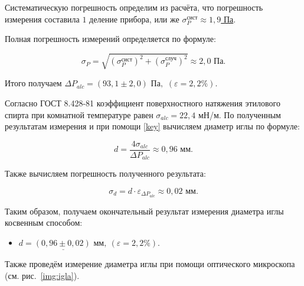 \documentclass[a4paper,12pt]{article} %
\begin{document}
Систематическую погрешность определим из расчёта, что погрешность измерения составила $ 1 $ деление прибора, или же \underline{$ \sigma_{P}^\text{сист} \approx 1,9 $ Па}.

Полная погрешность измерений определяется по формуле:

\begin{equation}\label{full_pogr}
\sigma_{P}=\sqrt{(\sigma_{P}^\text{сист})^2 + (\sigma_{P}^\text{случ})^2} \approx 2,0 \text{ Па}.
\end{equation}

Итого получаем \underline{ $ \Delta P_{alc} = (93,1 \pm 2,0) \text{ Па},$} \quad $(\varepsilon = 2,2 \%) $.

\medskip

Согласно ГОСТ 8.428-81 коэффициент поверхностного натяжения этилового спирта при комнатной температуре равен $ \sigma_{alc} = 22,4 $ мН/м. По полученным результатам измерения и при помощи \eqref{key} вычисляем диаметр иглы по формуле:

\label{diametr}

\begin{equation}\label{igla}
d=\frac{4\sigma_{alc}}{\Delta P_{alc}} \approx 0,96 \text{ мм}.
\end{equation}

Также вычисляем погрешность полученного результата:

\begin{equation}\label{igla_pogr}
\sigma_d=d\cdot\varepsilon_{\Delta P_{alc}} \approx 0,02 \text{ мм}.
\end{equation}

Таким образом, получаем окончательный результат измерения диаметра иглы косвенным способом:
\begin{itemize}
	\item $\underline{ d = (0,96 \pm 0,02) \text{ мм},} \: (\varepsilon = 2,2\%). $
\end{itemize}

Также проведём измерение диаметра иглы при помощи оптического микроскопа (см. рис.~\ref{img:igla}).
\end{document}
